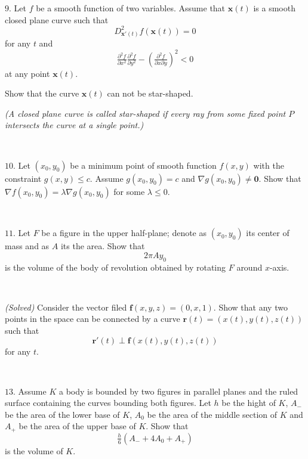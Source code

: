 \documentclass{article}
\def\noi{\noindent}%
\def\le{\leqslant}%
\begin{document}
\noi
$9$. Let $f$ be a smooth function of two variables. 
Assume that $\textbf{x}(t)$ is a smooth closed plane curve such that 
\[D^2_{\textbf{x}'(t)}f(\textbf{x}(t))=0\]
for any $t$ and
\[\tfrac{\partial^2 f}{\partial x^2}\tfrac{\partial^2 f}{\partial y^2}-(\tfrac{\partial^2 f}{\partial x\partial y})^2<0\]
at any point $\textbf{x}(t)$.

Show that the curve $\textbf{x}(t)$ can not be star-shaped.

\emph{(A closed plane curve is called star-shaped if every ray from some fixed point $P$ intersects the curve at a single point.)}

\ 



\noi
$10$. Let $(x_0,y_0)$ be a minimum point of smooth function $f(x,y)$ with the constraint $g(x,y)\le c$.
Assume $g(x_0,y_0)=c$ and $\nabla g(x_0,y_0)\ne \textbf{0}$.
Show that  
$\nabla f(x_0,y_0)=\lambda \nabla g(x_0,y_0)$
for some $\lambda\le 0$.

\ 

\noi
$11$. Let $F$ be a figure in the upper half-plane;
denote as $(x_0,y_0)$ its center of mass 
and as $A$ its the area.
Show that 
\[2\pi A y_0\]
is the volume of the body of revolution obtained by rotating $F$ around $x$-axis.

\ 

\noi
{}\textit{(Solved)}
Consider the vector filed $\mathbf{f}(x,y,z)=(0,x,1)$.
Show that any two points in the space can be connected by a curve $\mathbf{r}(t)=(x(t),y(t),z(t))$ 
such that 
\[\mathbf{r}'(t)\perp \mathbf{f}(x(t),y(t),z(t))\] 
for any $t$.

\ 

\noi
$13$. 
Assume  $K$ a body is bounded by two figures in parallel planes 
and the ruled surface containing the curves bounding both figures.
Let $h$ be the hight of $K$, 
$A_-$ be the area of the lower base of $K$, 
$A_{0}$ be the area of the middle section of $K$
and $A_+$ be the area of the upper base of $K$.
Show that 
\[\tfrac h6(A_-+4A_{0}+A_+)\]
is the volume of $K$.
\end{document}
